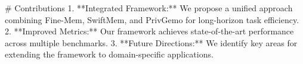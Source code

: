 # Contributions  
1. **Integrated Framework:** We propose a unified approach combining Fine-Mem, SwiftMem, and PrivGemo for long-horizon task efficiency.  
2. **Improved Metrics:** Our framework achieves state-of-the-art performance across multiple benchmarks.  
3. **Future Directions:** We identify key areas for extending the framework to domain-specific applications.

